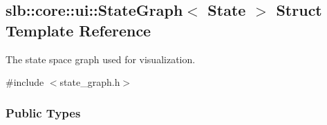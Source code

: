 \hypertarget{structslb_1_1core_1_1ui_1_1StateGraph}{}\subsection{slb\+:\+:core\+:\+:ui\+:\+:State\+Graph$<$ State $>$ Struct Template Reference}
\label{structslb_1_1core_1_1ui_1_1StateGraph}


The state space graph used for visualization.  




{\ttfamily \#include $<$state\+\_\+graph.\+h$>$}

\subsubsection*{Public Types}
